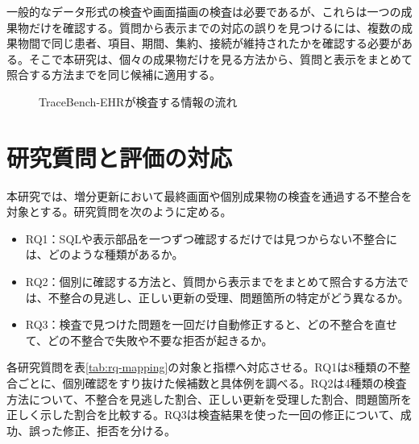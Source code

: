 \documentclass[a4paper]{jsarticle}
\begin{document}
一般的なデータ形式の検査や画面描画の検査は必要であるが、これらは一つの成果物だけを確認する。質問から表示までの対応の誤りを見つけるには、複数の成果物間で同じ患者、項目、期間、集約、接続が維持されたかを確認する必要がある。そこで本研究は、個々の成果物だけを見る方法から、質問と表示をまとめて照合する方法までを同じ候補に適用する。

\begin{figure}[t]
  \centering
  \caption{TraceBench-EHRが検査する情報の流れ}
  \label{fig:trace}
\end{figure}

\section{研究質問と評価の対応}

本研究では、増分更新において最終画面や個別成果物の検査を通過する不整合を対象とする。研究質問を次のように定める。

\begin{itemize}
  \item RQ1：SQLや表示部品を一つずつ確認するだけでは見つからない不整合には、どのような種類があるか。
  \item RQ2：個別に確認する方法と、質問から表示までをまとめて照合する方法では、不整合の見逃し、正しい更新の受理、問題箇所の特定がどう異なるか。
  \item RQ3：検査で見つけた問題を一回だけ自動修正すると、どの不整合を直せて、どの不整合で失敗や不要な拒否が起きるか。
\end{itemize}

各研究質問を表\ref{tab:rq-mapping}の対象と指標へ対応させる。RQ1は8種類の不整合ごとに、個別確認をすり抜けた候補数と具体例を調べる。RQ2は4種類の検査方法について、不整合を見逃した割合、正しい更新を受理した割合、問題箇所を正しく示した割合を比較する。RQ3は検査結果を使った一回の修正について、成功、誤った修正、拒否を分ける。
\end{document}

